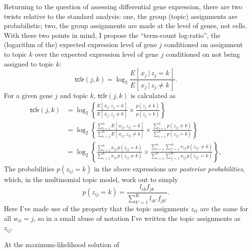 \documentclass[final]{siamart171218}
\begin{document}
Returning to the question of assessing differential gene expression,
there are two twists relative to the standard analysis: one, the group
(topic) assignments are probabilistic; two, the group assignments are
made at the level of genes, not cells. With these two points in mind,
I propose the ``term-count log-ratio'', the (logarithm of the)
expected expression level of gene $j$ conditioned on assignment to
topic $k$ over the expected expression level of gene $j$ conditioned
on not being assigned to topic $k$:
\begin{equation}
\mathsf{tclr}(j,k) =
\log_2 \frac{E[\,x_j \,|\, z_j = k\,]}{E[\,x_j \,|\, z_j \neq k\,]}.
\end{equation}
For a given gene $j$ and topic $k$, $\mathsf{tclr}(j,k)$ is calculated
as
\begin{align}
\mathsf{tclr}(j,k) &=
\log_2 \left\{ \frac{E[\, x_j, z_j = k \,]}{E[\, x_j, z_j \neq k\,]} \times
\frac{p(z_j \neq k)}{p(z_j = k)} \right\} \nonumber \\
&= \log_2 \left\{ \frac{\sum_{i=1}^n E[\, x_{ij}, z_{ij} = k \,]}
                       {\sum_{i=1}^n E[\, x_{ij}, z_{ij} \neq k\,]} \times
                  \frac{\sum_{i=1}^n p(z_{ij} \neq k)}
                       {\sum_{i=1}^n p(z_{ij} = k)} \right\} \nonumber \\
&= \log_2 \left\{ \frac{\sum_{i=1}^n x_{ij} \, p(z_{ij} = k)}
                       {\sum_{i=1}^n x_{ij} \, p(z_{ij} \neq k)} \times
                  \frac{\sum_{i=1}^n \sum_{j'=1}^m x_{ij} \, p(z_{ij'} \neq k)}
                       {\sum_{i=1}^n \sum_{j'=1}^m x_{ij} \, p(z_{ij'} = k)}
                  \right\},
\end{align}
The probabilities $p(z_{ij} = k)$ in the above expressions are {\em
  posterior probabilities}, which, in the multinomial topic model,
work out to simply
\begin{equation}
p(z_{ij} = k) = \frac{l_{ik} f_{jk}}{\sum_{k'=1}^K l_{ik'} f_{jk'}}.
\end{equation}
Here I've made use of the property that the topic assignments $z_{it}$
are the same for all $w_{it} = j$, so in a small abuse of notation
I've written the topic assignments as $z_{ij}$.

At the maximum-likelihood solution of 



\end{document}
